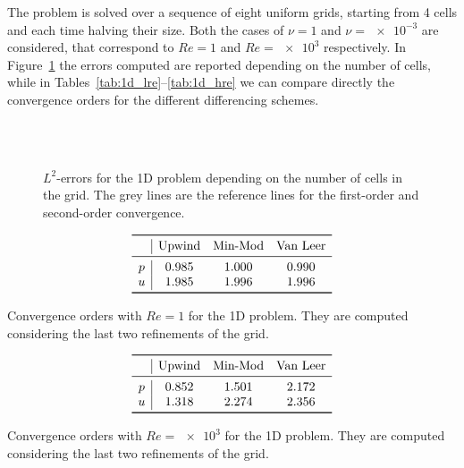 The problem is solved over a sequence of eight uniform grids, starting from 
4 cells and each time halving their size. Both the cases of $\nu=1$ 
and $\nu=\num{e-3}$ are considered, that correspond to $Re=1$ and $Re=\num{e3}$ 
respectively. In Figure~\ref{fig:1d_err} the errors computed are reported 
depending on the number of cells, while in 
Tables~\ref{tab:1d_lre}--\ref{tab:1d_hre} we can compare directly the 
convergence orders for the different differencing schemes.
\begin{figure}
	\centering
	\subfloat[Upwind, $Re = 1$]{
		}
	\subfloat[Upwind, $Re = \num{e3}$]{
		}\\
	\subfloat[Min-Mod, $Re = 1$]{
		}
	\subfloat[Min-Mod, $Re = \num{e3}$]{
		}\\
	\subfloat[Van Leer, $Re = 1$]{
		}
	\subfloat[Van Leer, $Re = \num{e3}$]{
		}
	\caption[$L^2$-errors for the 1D problem]{$L^2$-errors for the 1D problem 
	depending on the number of cells in the grid. The grey lines are the 
	reference lines for the first-order and second-order convergence.}
	\label{fig:1d_err}
\end{figure}
\begin{table}
	\centering
	\[
	\begin{array}{c|ccc}
	\toprule
	& \text{Upwind} & \text{Min-Mod} & \text{Van Leer} \\ 
	\midrule
	p & 0.985 & 1.000 & 0.990\\
	u & 1.985 & 1.996 & 1.996\\
	\bottomrule
	\end{array}
	\]
	\caption[Convergence orders with $Re = 1$ for the 1D problem]{Convergence 
	orders with $Re = 1$ for the 1D problem. They are computed considering the 
	last two refinements of the grid.}
	\label{tab:1d_lre}
	\[
	\begin{array}{c|ccc}
	\toprule
	& \text{Upwind} & \text{Min-Mod} & \text{Van Leer} \\ 
	\midrule
	p & 0.852 & 1.501 & 2.172\\
	u & 1.318 & 2.274 & 2.356\\
	\bottomrule
	\end{array}
	\]
	\caption[Convergence orders with $Re = \num{e3}$ for the 1D 
	problem]{Convergence orders with $Re = \num{e3}$ for the 1D problem. They 
	are computed considering the last two refinements of the grid.}
	\label{tab:1d_hre}
\end{table}
%

